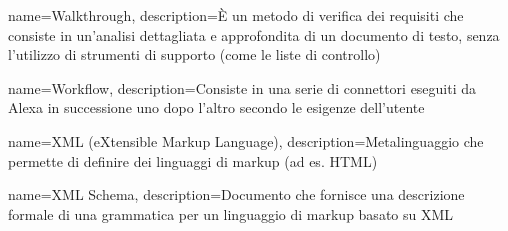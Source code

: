 {
	name={Walkthrough},
	description={È un metodo di verifica dei requisiti che consiste in un'analisi dettagliata e approfondita di un documento di testo, senza l'utilizzo di strumenti di supporto (come le liste di controllo)}
}

{
	name={Workflow},
	description={Consiste in una serie di connettori eseguiti da Alexa in successione uno dopo l'altro secondo le esigenze dell'utente}
	{\pagebreak}
}

{
	name={XML (eXtensible Markup Language)},
	description={Metalinguaggio che permette di definire dei linguaggi di markup (ad es. HTML)}
}

{
	name={XML Schema},
	description={Documento che fornisce una descrizione formale di una grammatica per un linguaggio di markup basato su XML}
}